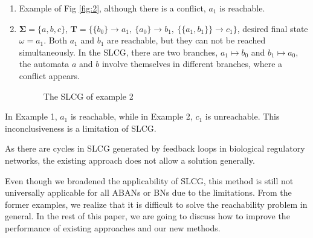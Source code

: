 \documentclass[runningheads]{llncs}
\newcommand{\acm}[3]{\{#1\}\rightarrow#3}
\begin{document}
\begin{enumerate}
\item Example of %
Fig \ref{fig:2}, although there is a conflict, $a_1$ is reachable.
\item $\mathbf{\Sigma}=\{a,b,c\}$, $\mathbf{T}=\{\acm{b_0}{a_0}{a_1},\ \acm{a_0}{b_0}{b_1},\ \acm{\{a_1,b_1\}}{c_0}{c_1}\}$,  desired final state $\omega=a_1$. 
Both $a_1$ and $b_1$ are reachable, but they can not be reached simultaneously.
In the SLCG, there are two branches, $a_1\mapsto b_0$ and $b_1\mapsto a_0$, the automata $a$ and $b$ involve themselves in different branches, where a conflict appears.
\begin{figure}[ht]
\centering

\caption{The SLCG of example 2}
\label{fig:3}
\end{figure}
%

\end{enumerate}

In Example 1, $a_1$ is reachable, while in Example 2, $c_1$ is unreachable. This inconclusiveness is a limitation of SLCG.

As there are cycles in SLCG generated by feedback loops in biological regulatory networks, the existing approach does not allow a solution generally.

Even though we broadened the applicability of SLCG, this method is still not universally applicable for all ABANs or BNs due to the limitations. From the former examples, we realize that it is difficult to solve the reachability problem in general. 
In the rest of this paper, we are going to discuss how to improve the performance of existing approaches and our new methods. 
\end{document}
